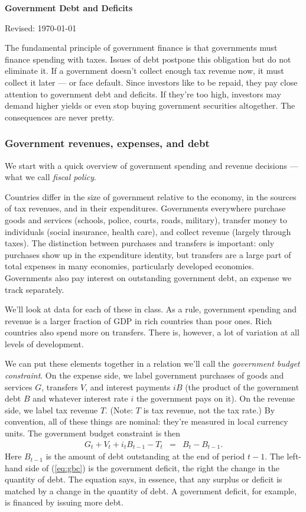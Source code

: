 \documentclass[letterpaper,12pt]{article}
\def\HeadName{Government Debt and Deficits}
\begin{document}
\thispagestyle{empty}%
\Head

\centerline{\large \bf \HeadName}%
\centerline{Revised: \today}

\bigskip
The fundamental principle of government finance is that
governments must finance spending with taxes.
Issues of debt postpone this obligation but do not eliminate it.
If a government doesn't collect enough tax revenue now,
it must collect it later --- or face default.
Since investors like to be repaid, they pay close attention
to government debt and deficits.
If they're too high, investors may demand higher yields
or even stop buying government securities altogether.
The consequences are never pretty.


\subsubsection*{Government revenues, expenses, and debt}

We start with a quick overview of
government spending and revenue decisions ---
what we call {\it fiscal policy\/}.

Countries differ in the size of government relative to the economy,
in the sources of tax revenues,
and in their expenditures.
Governments everywhere
purchase goods and services (schools, police, courts, roads, military),
transfer money to individuals (social insurance, health care),
and collect revenue (largely through taxes).
The distinction between purchases and transfers is important:
only purchases show up in the expenditure identity,
but transfers are a large part of total expenses in many economies,
particularly developed economies.
Governments also pay interest on outstanding government debt,
an expense we track separately.

We'll look at data for each of these in class.
As a rule, government spending and revenue is a larger fraction of GDP
in rich countries than poor ones.
Rich countries also spend more on transfers.
There is, however, a lot of variation at all levels of development.

We can put these elements together in a relation we'll call
the {\it government budget constraint\/}.
On the expense side, we label government purchases of goods and services $G$,
transfers $V$, and interest payments $iB$
(the product of the government debt $B$ and whatever interest rate $i$
the government pays on it).
On the revenue side, we label tax revenue $T$.
(Note: $T$ is tax revenue, not the tax rate.)
By convention, all of these things are nominal:
they're measured in local currency units.
The government budget constraint is then
\begin{eqnarray}
    G_t + V_t + i_t B_{t-1} - T_t  &=& B_{t} - B_{t-1}  .
    \label{eq:gbc}
\end{eqnarray}
Here $B_{t-1}$ is the amount of debt outstanding at the end of
period $t-1$.
The left-hand side of (\ref{eq:gbc})
is the government deficit,
the right the change in the quantity of debt.
The equation says, in essence, that any surplus or deficit is matched
by a change in the quantity of debt.
A government deficit, for example, is financed by issuing more debt.
\end{document}
